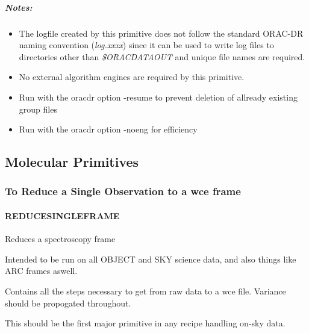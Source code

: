 \documentclass[twoside,11pt]{article}
\renewcommand{\_}{\texttt{\symbol{95}}}
\begin{document}
\subparagraph*{Notes:\label{_NIGHT_LOG__NOTES}}\begin{itemize}
\item 

The logfile created by this primitive does not follow the standard
ORAC-DR naming convention (\emph{log.xxxx}) since it can be used to write
log files to directories other than \emph{\$ORAC\_DATA\_OUT} and unique file
names are required.

\item 

No external algorithm engines are required by this primitive.

\item 

Run with the oracdr option -resume to prevent deletion of allready existing group files

\item 

Run with the oracdr option -noeng for efficiency

\end{itemize}

\subsection{Molecular Primitives}

\subsubsection{To Reduce a Single Observation to a \_wce frame}

\paragraph*{\_REDUCE\_SINGLE\_FRAME\_\label{_REDUCE_SINGLE_FRAME_}}

Reduces a spectroscopy frame

\mbox{}

Intended to be run on all OBJECT and SKY science data, and also things
like ARC frames aswell.



Contains all the steps necessary to get from raw data to a \_wce file.
Variance should be propogated throughout.



This should be the first major primitive in any recipe handling on-sky
data.
\end{document}

